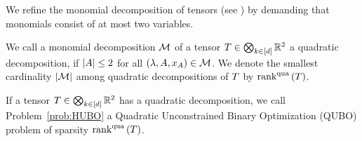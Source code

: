 
We refine the monomial decomposition of tensors (see ) by demanding that monomials consist of at most two variables.

\begin{definition}
	We call a monomial decomposition $\mathcal{M}$ of a tensor $T\in\bigotimes_{k\in[d]}\mathbb{R}^2$ a quadratic decomposition, if $\left|A\right|\leq 2$ for all $(\lambda,A,x_{A}) \in \mathcal{M}$.
	We denote the smallest cardinality $\left|\mathcal{M}\right|$ among quadratic decompositions of $T$ by $\mathrm{rank}^{\mathrm{qua}}\left(T\right)$.

	If a tensor $T\in\bigotimes_{k\in[d]}\mathbb{R}^2$ has a quadratic decomposition, we call Problem~\ref{prob:HUBO} a Quadratic Unconstrained Binary Optimization (QUBO) problem of sparsity $\mathrm{rank}^{\mathrm{qua}}\left(T\right)$.
\end{definition}







